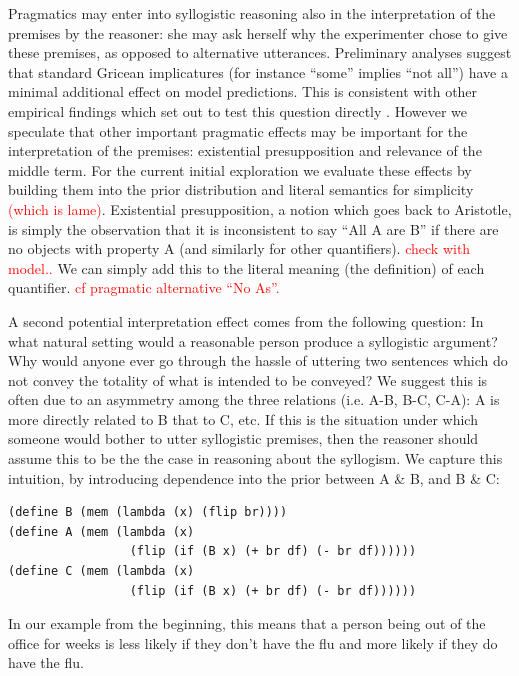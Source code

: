 \documentclass[10pt,letterpaper]{article}
\newcommand{\red}[1]{\textcolor{Red}{#1}}
\begin{document}
Pragmatics may enter into syllogistic reasoning also in the interpretation of the premises by the reasoner: she may ask herself why the experimenter chose to give these premises, as opposed to alternative utterances. 
Preliminary analyses suggest that standard Gricean implicatures (for instance ``some'' implies ``not all'') have a minimal additional effect on model predictions. This is consistent with other empirical findings which set out to test this question directly \cite{??}. 
However we speculate that other important pragmatic effects may be important for the interpretation of the premises: existential presupposition and relevance of the middle term.
%
For the current initial exploration we evaluate these effects by building them into the prior distribution and literal semantics for simplicity \red{(which is lame)}.
%
Existential presupposition, a notion which goes back to Aristotle, is simply the observation that it is inconsistent to say ``All A are B'' if there are no objects with property A (and similarly for other quantifiers). \red{check with model..} We can simply add this to the literal meaning (the definition) of each quantifier. \red{cf pragmatic alternative ``No As''.}

A second potential interpretation effect comes from the following question: In what natural setting would a reasonable person produce a syllogistic  argument? 
Why would anyone ever go through the hassle of uttering two sentences which do not convey the totality of what is intended to be conveyed? 
We suggest this is often due to an asymmetry among the three relations (i.e. A-B, B-C, C-A): A is more directly related to B that to C, etc.
If this is the situation under which someone would bother to utter syllogistic premises, then the reasoner should assume this to be the the case in reasoning about the syllogism.
We capture this intuition, by introducing dependence into the prior between A \& B, and B \& C:
 \begin{lstlisting}
(define B (mem (lambda (x) (flip br))))
(define A (mem (lambda (x) 
                 (flip (if (B x) (+ br df) (- br df))))))
(define C (mem (lambda (x) 
                 (flip (if (B x) (+ br df) (- br df))))))
\end{lstlisting}
In our example from the beginning, this means that a person being out of the office for weeks is less likely if they don't have the flu and more likely if they do have the flu. 
\end{document}
